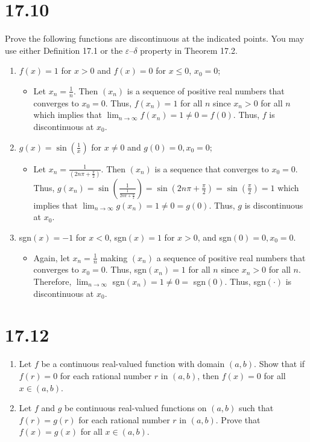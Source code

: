 \documentclass[10pt,a4paper]{article}
\theoremstyle{definition}
\begin{document}
\section*{17.10}
Prove the following functions are discontinuous at the indicated points. You may use either Definition 17.1 or the $\varepsilon$--$\delta$ property in Theorem 17.2.
\begin{enumerate}[label = (\alph*)]
\item $f(x) = 1$ for $x > 0$ and $f(x) = 0$ for $x \leq 0$, $x_0 = 0$;
	\begin{itemize}
	\item Let $x_n = \frac{1}{n}$. Then $(x_n)$ is a sequence of positive real numbers that converges to $x_0 = 0$. Thus, $f(x_n) = 1$ for all $n$ since $x_n > 0$ for all $n$ which implies that $\lim_{n \to \infty} f(x_n) = 1 \neq 0 = f(0)$. Thus, $f$ is discontinuous at $x_0$. 
	\end{itemize}
\item $g(x) = \sin\left(\frac{1}{x}\right)$ for $x \neq 0$ and $g(0) = 0, x_0 = 0$;
	\begin{itemize}
	\item Let $x_n = \frac{1}{(2n\pi + \frac{\pi}{2})}$. Then $(x_n)$ is a sequence that converges to $x_0 = 0$. Thus, $\displaystyle g(x_n) = \sin\left(\frac{1}{\frac{1}{2n\pi + \frac{\pi}{2}}}\right) = \sin\left(2n\pi + \frac{\pi}{2}\right) = \sin\left(\frac{\pi}{2}\right) = 1$ which implies that $\lim_{n \to \infty} g(x_n) = 1 \neq 0 = g(0)$. Thus, $g$ is discontinuous at $x_0$.
	\end{itemize}
\item sgn$(x) = -1$ for $x < 0$, sgn$(x) = 1$ for $x > 0$, and sgn$(0) = 0, x_0 = 0$.
	\begin{itemize}
	\item Again, let $x_n = \frac{1}{n}$ making $(x_n)$ a sequence of positive real numbers that converges to $x_0 = 0$. Thus, sgn$(x_n) = 1$ for all $n$ since $x_n > 0$ for all $n$. Therefore, $\lim_{n \to \infty}$ sgn$(x_n) = 1 \neq 0 = $ sgn$(0)$. Thus, sgn$(\cdot)$ is discontinuous at $x_0$. 
	\end{itemize}
\end{enumerate}

\section*{17.12}
\begin{enumerate}[label = (\alph*)]
\item Let $f$ be a continuous real-valued function with domain $(a,b)$. Show that if $f(r) = 0$ for each rational number $r$ in $(a,b)$, then $f(x) = 0$ for all $x \in (a,b)$.
\item Let $f$ and $g$ be continuous real-valued functions on $(a,b)$ such that $f(r) = g(r)$ for each rational number $r$ in $(a,b)$. Prove that $f(x) = g(x)$ for all $x \in (a,b)$.
\end{enumerate}
\end{document}
